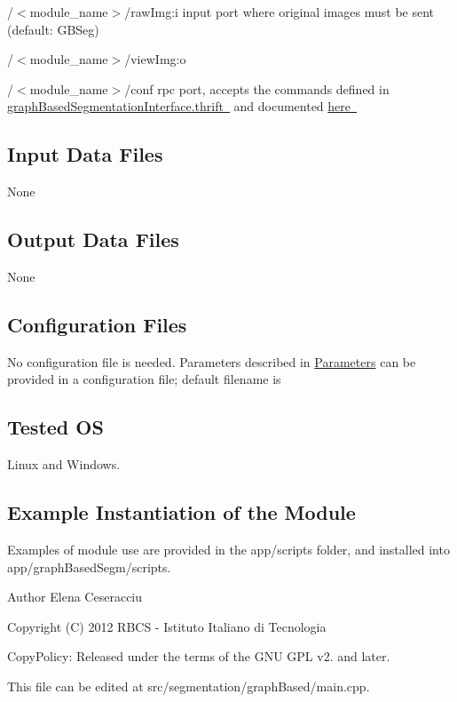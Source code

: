 \begin{DoxyItemize}
\item /$<$module\+\_\+name$>$/raw\+Img\+:i input port where original images must be sent (default\+: G\+B\+Seg)
\item /$<$module\+\_\+name$>$/view\+Img\+:o
\item /$<$module\+\_\+name$>$/conf rpc port, accepts the commands defined in \mbox{\hyperlink{}{graph\+Based\+Segmentation\+Interface.\+thrift }} and documented \mbox{\hyperlink{}{here }}
\end{DoxyItemize}\hypertarget{group__lumaChroma_in_files_sec}{}\subsection{Input Data Files}\label{group__lumaChroma_in_files_sec}
None\hypertarget{group__lumaChroma_out_data_sec}{}\subsection{Output Data Files}\label{group__lumaChroma_out_data_sec}
None\hypertarget{group__lumaChroma_conf_file_sec}{}\subsection{Configuration Files}\label{group__lumaChroma_conf_file_sec}
No configuration file is needed. Parameters described in \mbox{\hyperlink{group__seg2cloud_parameters_sec}{Parameters}} can be provided in a configuration file; default filename is\hypertarget{group__blobExtractor_tested_os_sec}{}\subsection{Tested OS}\label{group__blobExtractor_tested_os_sec}
Linux and Windows.\hypertarget{group__lumaChroma_example_sec}{}\subsection{Example Instantiation of the Module}\label{group__lumaChroma_example_sec}
Examples of module use are provided in the app/scripts folder, and installed into app/graph\+Based\+Segm/scripts.

\begin{DoxyAuthor}{Author}
Elena Ceseracciu
\end{DoxyAuthor}
Copyright (C) 2012 R\+B\+CS -\/ Istituto Italiano di Tecnologia

Copy\+Policy\+: Released under the terms of the G\+NU G\+PL v2. and later.

This file can be edited at src/segmentation/graph\+Based/main.\+cpp. 